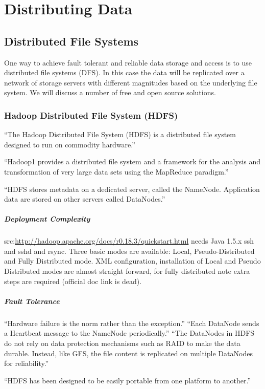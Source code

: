 \section{Distributing Data}
\subsection{Distributed File Systems}
One way to achieve fault tolerant and reliable data storage and access is to use
distributed file systems (DFS). In this case the data will be replicated over a
network of storage servers with different magnitudes based on the underlying file
system. We will discuss a number of free and open source solutions.

\subsubsection{Hadoop Distributed File System (HDFS)}
``The Hadoop Distributed File System (HDFS) is a distributed file system designed to run on
commodity hardware.'' \cite[tp.~3]{HDFSDocuments}

``Hadoop1 provides a distributed file system and a framework 
for the analysis and transformation of very large data sets 
using the MapReduce \cite{DG04} paradigm.''\cite{TheHDFS}

``HDFS stores metadata on a
dedicated server, called the NameNode. Application data are stored on
other servers called DataNodes.''\cite{TheHDFS}


\subparagraph{Deployment Complexity}
src:\url{http://hadoop.apache.org/docs/r0.18.3/quickstart.html}
needs Java 1.5.x ssh and sshd and rsync. Three basic modes are available:
Local, Pseudo-Distributed and Fully Distributed mode. XML configuration,
installation of Local and Pseudo Distributed modes are almost straight
forward, for fully distributed note extra steps are required (official
doc link is dead).


\subparagraph{Fault Tolerance}
``Hardware failure is the norm rather than the exception.''
``Each DataNode sends a Heartbeat message to the NameNode periodically.''
``The DataNodes in HDFS do not rely on data protection mechanisms 
such as RAID to make the data durable. Instead, like GFS, 
the file content is replicated on multiple DataNodes for reliability.''
\cite{TheHDFS}

``HDFS has been designed to be easily portable from one platform to another.''


